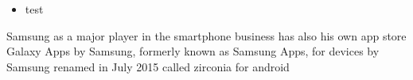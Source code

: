 \begin{itemize}
    \item test
\end{itemize}
Samsung as a major player in the smartphone business has also his own app store \cite{comscoreMarket}
Galaxy Apps by Samsung, formerly known as Samsung Apps, for devices by Samsung
renamed in July 2015
called zirconia for android
\cite{samsungZirconia}
%
